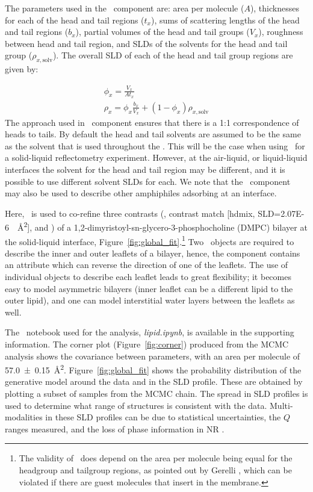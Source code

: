 \documentclass[pdf,preprint]{iucr}
\begin{document}
The parameters used in the \LipidLeaflet\ component are: area per molecule ($A$), thicknesses for each of the head and tail regions ($t_x$), sums of scattering lengths of the head and tail regions ($b_x$), partial volumes of the head and tail groups ($V_x$), roughness between head and tail region, and SLDs of the solvents for the head and tail group ($\rho_{x,\mathrm{solv}}$). The overall SLD of each of the head and tail group regions are given by:

\begin{gather} 
\label{eqn:3} \phi_{x} = \frac{V_x}{At_x}\\
\rho_x =  \phi_{x} \frac{b_x}{V_x} + (1 - \phi_{x})\rho_{x,\mathrm{solv}} \label{eqn:4}
\end{gather}
The approach used in \LipidLeaflet\ component ensures that there is a 1:1 correspondence of heads to tails.
By default the head and tail solvents are assumed to be the same as the solvent that is used throughout the \Structure. This will be the case when using \LipidLeaflet\ for a solid-liquid reflectometry experiment. However, at the air-liquid, or liquid-liquid interfaces the solvent for the head and tail region may be different, and it is possible to use different solvent SLDs for each. We note that the \LipidLeaflet\ component may also be used to describe other amphiphiles adsorbing at an interface.

Here, \LipidLeaflet\ is used to co-refine three contrasts (,  contrast match [hdmix, SLD=\SI{2.07E-6}{\per\square\angstrom}], and ) of a 1,2-dimyristoyl-sn-glycero-3-phospho\-choline (DMPC) bilayer at the solid-liquid interface, Figure~\ref{fig:global_fit}.\footnote{The validity of \LipidLeaflet\ does depend on the area per molecule being equal for the headgroup and tailgroup regions, as pointed out by Gerelli \cite{Gerelli2016}, which can be violated if there are guest molecules that insert in the membrane.} Two \LipidLeaflet\ objects are required to describe the inner and outer leaflets of a bilayer, hence, the component contains an attribute which can reverse the direction of one of the leaflets. The use of individual objects to describe each leaflet leads to great flexibility; it becomes easy to model asymmetric bilayers (inner leaflet can be a different lipid to the outer lipid), and one can model interstitial water layers between the leaflets as well.

The \Jupyter\ notebook used for the analysis, \emph{lipid.ipynb}, is available in the supporting information. The corner plot (Figure~\ref{fig:corner}) produced from the MCMC analysis shows the covariance between parameters, with an area per molecule of \SI{57.0 \pm0.15}{\square\angstrom}. Figure~\ref{fig:global_fit} shows the probability distribution of the generative model around the data and in the SLD profile. These are obtained by plotting a subset of samples from the MCMC chain. The spread in SLD profiles is used to determine what range of structures is consistent with the data. Multi-modalities in these SLD profiles can be due to statistical uncertainties, the $Q$ ranges measured, and the loss of phase information in NR \cite{Majkrzak1999, Heinrich2009}.
\end{document}
